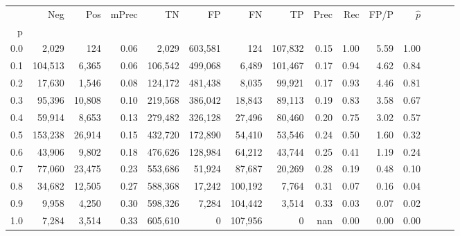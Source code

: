 \begin{tabular}{rrrrrrrrrrrrrrr}
\toprule
{} &      Neg &     Pos & mPrec &       TN &       FP &       FN &       TP &  Prec &   Rec &  FP/P & $\hat{p}$ \\
p   &          &         &       &          &          &          &          &       &       &       &           \\
\midrule
0.0 &    2,029 &     124 &  0.06 &    2,029 &  603,581 &      124 &  107,832 &  0.15 &  1.00 &  5.59 &      1.00 \\
0.1 &  104,513 &   6,365 &  0.06 &  106,542 &  499,068 &    6,489 &  101,467 &  0.17 &  0.94 &  4.62 &      0.84 \\
0.2 &   17,630 &   1,546 &  0.08 &  124,172 &  481,438 &    8,035 &   99,921 &  0.17 &  0.93 &  4.46 &      0.81 \\
0.3 &   95,396 &  10,808 &  0.10 &  219,568 &  386,042 &   18,843 &   89,113 &  0.19 &  0.83 &  3.58 &      0.67 \\
0.4 &   59,914 &   8,653 &  0.13 &  279,482 &  326,128 &   27,496 &   80,460 &  0.20 &  0.75 &  3.02 &      0.57 \\
0.5 &  153,238 &  26,914 &  0.15 &  432,720 &  172,890 &   54,410 &   53,546 &  0.24 &  0.50 &  1.60 &      0.32 \\
0.6 &   43,906 &   9,802 &  0.18 &  476,626 &  128,984 &   64,212 &   43,744 &  0.25 &  0.41 &  1.19 &      0.24 \\
0.7 &   77,060 &  23,475 &  0.23 &  553,686 &   51,924 &   87,687 &   20,269 &  0.28 &  0.19 &  0.48 &      0.10 \\
0.8 &   34,682 &  12,505 &  0.27 &  588,368 &   17,242 &  100,192 &    7,764 &  0.31 &  0.07 &  0.16 &      0.04 \\
0.9 &    9,958 &   4,250 &  0.30 &  598,326 &    7,284 &  104,442 &    3,514 &  0.33 &  0.03 &  0.07 &      0.02 \\
1.0 &    7,284 &   3,514 &  0.33 &  605,610 &        0 &  107,956 &        0 &   nan &  0.00 &  0.00 &      0.00 \\
\bottomrule
\end{tabular}
